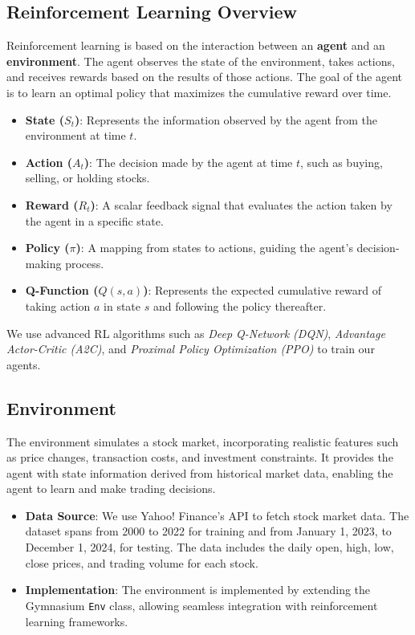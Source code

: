 \documentclass[conference]{IEEEtran}
\begin{document}
\subsection{Reinforcement Learning Overview}

Reinforcement learning is based on the interaction between an \textbf{agent} and an \textbf{environment}. The agent observes the state of the environment, takes actions, and receives rewards based on the results of those actions. The goal of the agent is to learn an optimal policy that maximizes the cumulative reward over time.

\begin{itemize}
    \item \textbf{State ($S_t$)}: Represents the information observed by the agent from the environment at time $t$.
    \item \textbf{Action ($A_t$)}: The decision made by the agent at time $t$, such as buying, selling, or holding stocks.
    \item \textbf{Reward ($R_t$)}: A scalar feedback signal that evaluates the action taken by the agent in a specific state.
    \item \textbf{Policy ($\pi$)}: A mapping from states to actions, guiding the agent's decision-making process.
    \item \textbf{Q-Function ($Q(s, a)$)}: Represents the expected cumulative reward of taking action $a$ in state $s$ and following the policy thereafter.
\end{itemize}

We use advanced RL algorithms such as \textit{Deep Q-Network (DQN)}, \textit{Advantage Actor-Critic (A2C)}, and \textit{Proximal Policy Optimization (PPO)} to train our agents.

\subsection{Environment}

The environment simulates a stock market, incorporating realistic features such as price changes, transaction costs, and investment constraints. It provides the agent with state information derived from historical market data, enabling the agent to learn and make trading decisions.

\begin{itemize}
    \item \textbf{Data Source}: We use Yahoo! Finance's API to fetch stock market data. The dataset spans from 2000 to 2022 for training and from January 1, 2023, to December 1, 2024, for testing. The data includes the daily open, high, low, close prices, and trading volume for each stock.
    \item \textbf{Implementation}: The environment is implemented by extending the Gymnasium \texttt{Env} class, allowing seamless integration with reinforcement learning frameworks.
\end{itemize}
\end{document}
